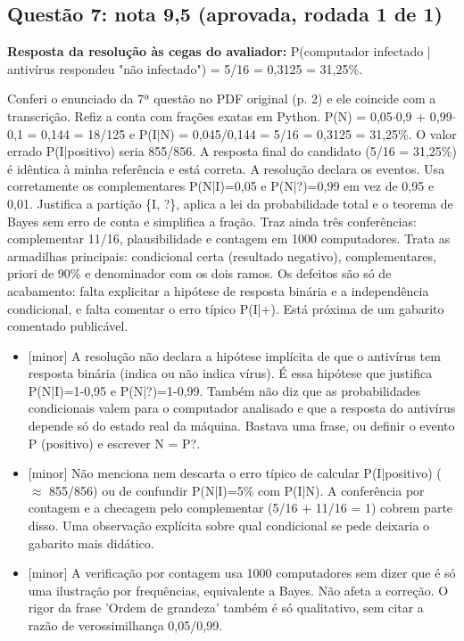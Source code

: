 \documentclass{article}%
\begin{document}
\subsection*{Questão 7: nota 9,5 (aprovada, rodada 1 de 1)}%
\textbf{Resposta da resolução às cegas do avaliador:} P(computador infectado | antivírus respondeu "não infectado") = 5/16 = 0,3125 = 31,25\%.\par %
Conferi o enunciado da 7ª questão no PDF original (p. 2) e ele coincide com a transcrição. Refiz a conta com frações exatas em Python. P(N) = 0,05$\cdot$0,9 + 0,99$\cdot$0,1 = 0,144 = 18/125 e P(I|N) = 0,045/0,144 = 5/16 = 0,3125 = 31,25\%. O valor errado P(I|positivo) seria 855/856. A resposta final do candidato (5/16 = 31,25\%) é idêntica à minha referência e está correta. A resolução declara os eventos. Usa corretamente os complementares P(N|I)=0,05 e P(N|?)=0,99 em vez de 0,95 e 0,01. Justifica a partição \{I, ?\}, aplica a lei da probabilidade total e o teorema de Bayes sem erro de conta e simplifica a fração. Traz ainda três conferências: complementar 11/16, plausibilidade e contagem em 1000 computadores. Trata as armadilhas principais: condicional certa (resultado negativo), complementares, priori de 90\% e denominador com os dois ramos. Os defeitos são só de acabamento: falta explicitar a hipótese de resposta binária e a independência condicional, e falta comentar o erro típico P(I|+). Está próxima de um gabarito comentado publicável.%
\begin{itemize}%
\item%
{[}minor{]} A resolução não declara a hipótese implícita de que o antivírus tem resposta binária (indica ou não indica vírus). É essa hipótese que justifica P(N|I)=1-0,95 e P(N|?)=1-0,99. Também não diz que as probabilidades condicionais valem para o computador analisado e que a resposta do antivírus depende só do estado real da máquina. Bastava uma frase, ou definir o evento P (positivo) e escrever N = P?.%
\item%
{[}minor{]} Não menciona nem descarta o erro típico de calcular P(I|positivo) ($\approx$ 855/856) ou de confundir P(N|I)=5\% com P(I|N). A conferência por contagem e a checagem pelo complementar (5/16 + 11/16 = 1) cobrem parte disso. Uma observação explícita sobre qual condicional se pede deixaria o gabarito mais didático.%
\item%
{[}minor{]} A verificação por contagem usa 1000 computadores sem dizer que é só uma ilustração por frequências, equivalente a Bayes. Não afeta a correção. O rigor da frase 'Ordem de grandeza' também é só qualitativo, sem citar a razão de verossimilhança 0,05/0,99.%
\end{itemize}%
\end{document}
